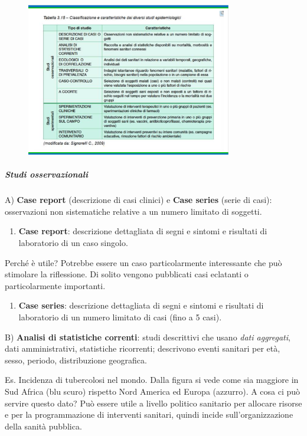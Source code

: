 \begin{figure}[!ht]
\centering
	\includegraphics[width=0.8\textwidth]{04/image3.png}
	\end{figure}

\subparagraph{Studi osservazionali }


A) \textbf{Case report} (descrizione di casi clinici) e \textbf{Case
series} (serie di casi): osservazioni non sistematiche relative a un
numero limitato di soggetti.

\begin{enumerate}
\def\labelenumi{\arabic{enumi}.}
\item
  \textbf{Case report}: descrizione dettagliata di segni e sintomi e
  risultati di laboratorio di un caso singolo.
\end{enumerate}

Perché è utile? Potrebbe essere un caso particolarmente interessante che
può stimolare la riflessione. Di solito vengono pubblicati casi
eclatanti o particolarmente importanti.

\begin{enumerate}
\def\labelenumi{\arabic{enumi}.}
\item
  \textbf{Case series}: descrizione dettagliata di segni e sintomi e
  risultati di laboratorio di un numero limitato di casi (fino a 5
  casi).
\end{enumerate}

B) \textbf{Analisi di statistiche correnti}: studi descrittivi che usano
\emph{dati aggregati}, dati amministrativi, statistiche ricorrenti;
descrivono eventi sanitari per età, sesso, periodo, distribuzione
geografica.

Es. Incidenza di tubercolosi nel mondo. Dalla figura si vede come sia
maggiore in Sud Africa (blu scuro) rispetto Nord America ed Europa
(azzurro). A cosa ci può servire questo dato? Può essere utile a livello
politico sanitario per allocare risorse e per la programmazione di
interventi sanitari, quindi incide sull'organizzazione della sanità
pubblica.

